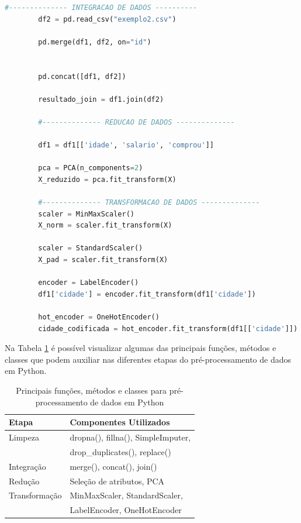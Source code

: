 \documentclass[12pt, a4paper]{article}
\begin{document}
\begin{itemize}
\begin{lstlisting}[language=Python, title = {Exemplo de funções e métodos em Python}]
        #-------------- INTEGRACAO DE DADOS ----------
        df2 = pd.read_csv("exemplo2.csv")

        pd.merge(df1, df2, on="id")

        
        pd.concat([df1, df2])

        resultado_join = df1.join(df2)

        #-------------- REDUCAO DE DADOS --------------

        df1 = df1[['idade', 'salario', 'comprou']]

        pca = PCA(n_components=2)
        X_reduzido = pca.fit_transform(X)

        #-------------- TRANSFORMACAO DE DADOS --------------
        scaler = MinMaxScaler()
        X_norm = scaler.fit_transform(X)

        scaler = StandardScaler()
        X_pad = scaler.fit_transform(X)

        encoder = LabelEncoder()
        df1['cidade'] = encoder.fit_transform(df1['cidade'])

        hot_encoder = OneHotEncoder()
        cidade_codificada = hot_encoder.fit_transform(df1[['cidade']])

    \end{lstlisting}
    \end{itemize}

    Na Tabela \ref{tab:preprocessamento} é possível visualizar algumas das principais funções,
    métodos e classes que podem auxiliar nas diferentes etapas do
    pré-processamento de dados em Python.
    \begin{table}[h]
        \centering
        \begin{tabular}{ll}
        \toprule
        Etapa & Componentes Utilizados \\
        \midrule
        Limpeza &
        dropna(), fillna(), SimpleImputer, \\
        & drop\_duplicates(), replace() \\

        Integração &
        merge(), concat(), join() \\

        Redução &
        Seleção de atributos, PCA \\

        Transformação &
        MinMaxScaler, StandardScaler, \\
        & LabelEncoder, OneHotEncoder \\
        \bottomrule
        \end{tabular}
        \caption{Principais funções, métodos e classes para pré-processamento de dados em Python}
        \label{tab:preprocessamento}
    \end{table}

\nocite{datacamp_preprocessing,pandas_docs, sklearn-doc}

\end{document}
